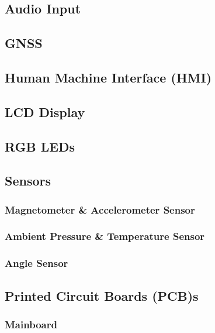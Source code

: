 
\subsection{Audio Input}

\subsection{GNSS}

\subsection{Human Machine Interface (HMI)}


\subsection{LCD Display}

\subsection{RGB LEDs}

\subsection{Sensors}

\subsubsection{Magnetometer \& Accelerometer Sensor}

\subsubsection{Ambient Pressure \& Temperature Sensor}

\subsubsection{Angle Sensor}

\subsection{Printed Circuit Boards (PCB)s}

\subsubsection{Mainboard}

